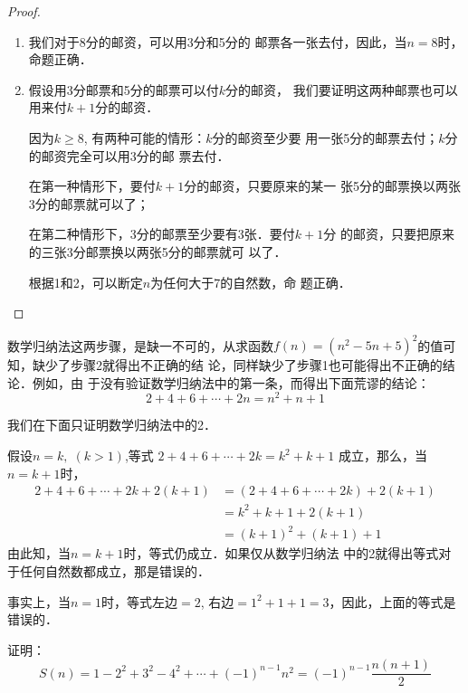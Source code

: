 \begin{proof}
\begin{enumerate}
    \item 我们对于8分的邮资，可以用3分和5分的
    邮票各一张去付，因此，当$n=8$时，命题正确．
    \item 假设用3分邮票和5分的邮票可以付$k$分的邮资，
    我们要证明这两种邮票也可以用来付$k+1$分的邮资．

    因为$k\ge 8$, 有两种可能的情形：$k$分的邮资至少要
    用一张5分的邮票去付；$k$分的邮资完全可以用3分的邮
    票去付．

    在第一种情形下，要付$k+1$分的邮资，只要原来的某一
    张5分的邮票换以两张3分的邮票就可以了；

    在第二种情形下，3分的邮票至少要有3张．要付$k+1$分
    的邮资，只要把原来的三张3分邮票换以两张5分的邮票就可
    以了．

    根据1和2，可以断定$n$为任何大于7的自然数，命
    题正确．
\end{enumerate}
\end{proof}

数学归纳法这两步骤，是缺一不可的，从求函数$f(n)=
(n^2-5n+5)^2$的值可知，缺少了步骤2就得出不正确的结
论，同样缺少了步骤1也可能得出不正确的结论．例如，由
于没有验证数学归纳法中的第一条，而得出下面荒谬的结论：
\[2+4+6+\cdots+2n=n^2+n+1\]

我们在下面只证明数学归纳法中的2．

假设$n=k,\; (k>1)$,等式
$2+4+6+\cdots+2k=k^2+k+1$
成立，那么，当$n=k+1$时，
\begin{align*}
    2+4+6+\cdots+2k+2(k+1)&=(2+4+6+\cdots+2k)+2(k+1)\\
&=k^2+k+1+2(k+1)  \tag{数学归纳法假设}\\
&=(k+1)^2+(k+1)+1
\end{align*}
由此知，当$n=k+1$时，等式仍成立．如果仅从数学归纳法
中的2就得出等式对于任何自然数都成立，那是错误的．

事实上，当$n=1$时，等式左边$=2$, 右边$=1^2+1+1=
3$，因此，上面的等式是错误的．

\begin{example}
    证明：
\[S(n)=1-2^2+3^2-4^2+\cdots+(-1)^{n-1}n^2=(-1)^{n-1}\frac{n(n+1)}{2}\]
\end{example}

